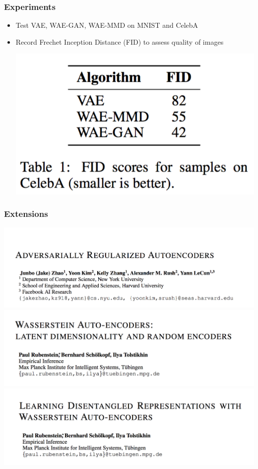 \documentclass{beamer}
\begin{document}
\begin{frame}
\frametitle{Experiments}
\begin{itemize}
\setlength\itemsep{1em}
\item Test VAE, WAE-GAN, WAE-MMD on MNIST and CelebA

\item Record Frechet Inception Distance (FID) to assess quality of images

\begin{center}
\includegraphics[scale=0.5]{experiments}
\end{center}

\end{itemize}
\end{frame}

\begin{frame}
\frametitle{Extensions}
\begin{center}
\includegraphics[scale=0.3]{paper1} \\ 
\includegraphics[scale=0.3]{paper2} \\
\includegraphics[scale=0.3]{paper3}
\end{center}
\end{frame}
\end{document}
